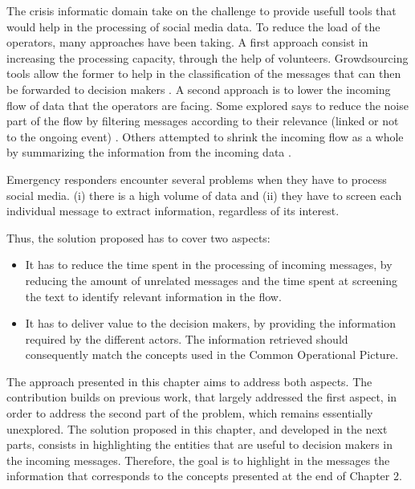 The crisis informatic domain take on the challenge to provide usefull tools that would
help in the processing of social media data.
To reduce the load of the operators, many approaches have been taking.
A first approach consist in increasing the processing capacity, through the help of volunteers.
Growdsourcing tools allow the former to help in the classification of the messages that can
then be forwarded to decision makers \parencite{imranAIDRArtificialIntelligence2014}.
A second approach is to lower the incoming flow of data that the operators are facing.
Some explored says to reduce the noise part of the flow by filtering messages according
to their relevance (linked or not to the ongoing event) \parencite{carageaClassifyingTextMessages2011,imranAIDRArtificialIntelligence2014}.
Others attempted to shrink the incoming flow as a whole by summarizing the information
from the incoming data \parencite{rudraSummarizingSituationalTweets2016}.

Emergency responders encounter several problems when they have to process social media.
(i) there is a high volume of data and (ii) they have to screen each individual message
to extract information, regardless of its interest.

Thus, the solution proposed has to cover two aspects:
\begin{itemize}
    \item It has to reduce the time spent in the processing of incoming messages, by reducing the
          amount of unrelated messages and the time spent at screening the text to identify relevant
          information in the flow.
    \item It has to deliver value to the decision makers, by providing the information
          required by the different actors. The information retrieved should consequently match
          the concepts used in the Common Operational Picture.
\end{itemize}

The approach presented in this chapter aims to address both aspects.
The contribution builds on previous work, that largely addressed the first aspect, in
order to address the second part of the problem, which remains essentially unexplored.
The solution proposed in this chapter, and developed in the next parts, consists in
highlighting the entities that are useful to decision makers in the incoming messages.
Therefore, the goal is to highlight in the messages the information that corresponds to
the concepts presented at the end of Chapter 2.

